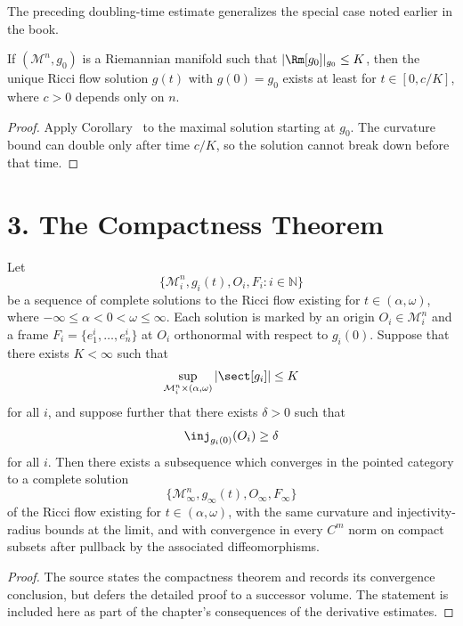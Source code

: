 \begin{remark}
\label{ch07-rem-special-case-doubling-time}
The preceding doubling-time estimate generalizes the special case noted earlier in the book.
\end{remark}

\begin{corollary}
\label{ch07-cor-minimal-existence-time}
If \((\mathcal M^n,g_0)\) is a Riemannian manifold such that \(|\Rm[g_0]|_{g_0}\le K\), then the unique Ricci flow solution \(g(t)\) with \(g(0)=g_0\) exists at least for \(t\in[0,c/K]\), where \(c>0\) depends only on \(n\).
\end{corollary}

\begin{proof}
\sketch Apply Corollary~ to the maximal solution starting at \(g_0\). The curvature bound can double only after time \(c/K\), so the solution cannot break down before that time.
\end{proof}

\section*{3. The Compactness Theorem}

\begin{theorem}
\label{ch07-thm-compactness-theorem}
Let
\[
\{\mathcal M_i^n,g_i(t),O_i,F_i:i\in\mathbb N\}
\]
be a sequence of complete solutions to the Ricci flow existing for \(t\in(\alpha,\omega)\), where \(-\infty\le \alpha<0<\omega\le\infty\). Each solution is marked by an origin \(O_i\in \mathcal M_i^n\) and a frame \(F_i=\{e_1^i,\dots,e_n^i\}\) at \(O_i\) orthonormal with respect to \(g_i(0)\). Suppose that there exists \(K<\infty\) such that
\[
\sup_{\mathcal M_i^n\times(\alpha,\omega)}|\sect[g_i]|\le K
\]
for all \(i\), and suppose further that there exists \(\delta>0\) such that
\[
\inj_{g_i(0)}(O_i)\ge \delta
\]
for all \(i\). Then there exists a subsequence which converges in the pointed category to a complete solution
\[
\{\mathcal M_\infty^n,g_\infty(t),O_\infty,F_\infty\}
\]
of the Ricci flow existing for \(t\in(\alpha,\omega)\), with the same curvature and injectivity-radius bounds at the limit, and with convergence in every \(C^m\) norm on compact subsets after pullback by the associated diffeomorphisms.
\end{theorem}

\begin{proof}
\sketch The source states the compactness theorem and records its convergence conclusion, but defers the detailed proof to a successor volume. The statement is included here as part of the chapter's consequences of the derivative estimates.
\end{proof}
